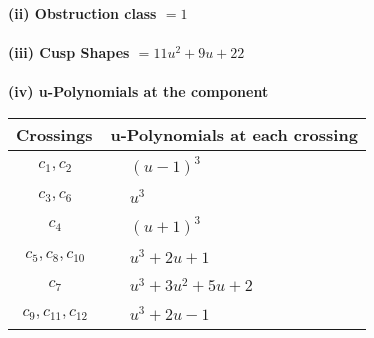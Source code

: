 \documentclass[1p]{elsarticle_modified}
\theoremstyle{definition}
\begin{document}
\flushleft \textbf{(ii) Obstruction class $= 1$}\\~\\
\flushleft \textbf{(iii) Cusp Shapes $= 11 u^2+9 u+22$}\\~\\
\newpage\renewcommand{\arraystretch}{1}
\flushleft \textbf{(iv) u-Polynomials at the component}\newline \\
\begin{tabular}{m{50pt}|m{274pt}}
Crossings & \hspace{64pt}u-Polynomials at each crossing \\
\hline $$\begin{aligned}c_{1},c_{2}\end{aligned}$$&$\begin{aligned}
&(u-1)^3
\end{aligned}$\\
\hline $$\begin{aligned}c_{3},c_{6}\end{aligned}$$&$\begin{aligned}
&u^3
\end{aligned}$\\
\hline $$\begin{aligned}c_{4}\end{aligned}$$&$\begin{aligned}
&(u+1)^3
\end{aligned}$\\
\hline $$\begin{aligned}c_{5},c_{8},c_{10}\end{aligned}$$&$\begin{aligned}
&u^3+2 u+1
\end{aligned}$\\
\hline $$\begin{aligned}c_{7}\end{aligned}$$&$\begin{aligned}
&u^3+3 u^2+5 u+2
\end{aligned}$\\
\hline $$\begin{aligned}c_{9},c_{11},c_{12}\end{aligned}$$&$\begin{aligned}
&u^3+2 u-1
\end{aligned}$\\
\hline
\end{tabular}\\~\\
\newpage\renewcommand{\arraystretch}{1}
\end{document}
